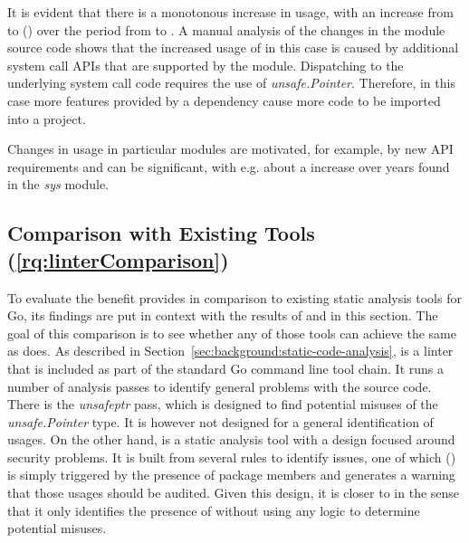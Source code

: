 It is evident that there is a monotonous increase in \unsafe{} usage, with an increase from \sysModuleLeastUnsafe{} to
\sysModuleMostUnsafe{} (\sysModuleUnsafeIncrease) over the  period from  to
.
A manual analysis of the changes in the module source code shows that the increased usage of \unsafe{} in this case is
caused by additional system call \acrshort{API}s that are supported by the module.
Dispatching to the underlying system call code requires the use of \textit{unsafe.Pointer}.
Therefore, in this case more features provided by a dependency cause more \unsafe{} code to be imported into a project.


\begin{answerToRQ}[\ref{rq:changeTime}]
    Changes in \unsafe{} usage in particular modules are motivated, for example, by new \acrshort{API} requirements and
    can be significant, with e.g. about a \sysModuleUnsafeIncreaseRounded{} increase over  years found in
    the \textit{sys} module.
\end{answerToRQ}



\subsection{Comparison with Existing Tools (\ref{rq:linterComparison})}\label{subsec:go-geiger:evaluation:linters-comparison}

To evaluate the benefit \toolGeiger{} provides in comparison to existing static analysis tools for Go, its findings are
put in context with the results of \toolVet{} and \toolGosec{} in this section.
The goal of this comparison is to see whether any of those tools can achieve the same as \toolGeiger{} does.
As described in Section~\ref{sec:background:static-code-analysis}, \toolVet{} is a linter that is included as part of
the standard Go command line tool chain.
It runs a number of analysis passes to identify general problems with the source code.
There is the \textit{unsafeptr} pass, which is designed to find potential misuses of the \textit{unsafe.Pointer} type.
It is however not designed for a general identification of \unsafe{} usages.
On the other hand, \toolGosec{} is a static analysis tool with a design focused around security problems.
It is built from several rules to identify issues, one of which (\textit{}) is simply triggered by the
presence of \unsafe{} package members and generates a warning that those usages should be audited.
Given this design, it is closer to \toolGeiger{} in the sense that it only identifies the presence of \unsafe{} without
using any logic to determine potential misuses.

